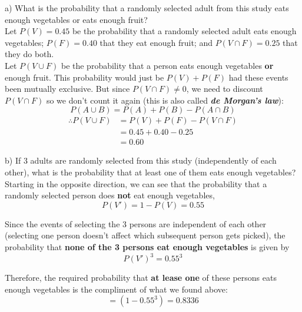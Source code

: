 \documentclass[boxes, qed]{homework}
\begin{document}
\begin{solution}
  a) What is the probability that a randomly selected adult 
  from this study eats enough vegetables or eats enough fruit?\\

  Let $P(V) = 0.45$ be the probability that a randomly selected
  adult eats enough vegetables; $P(F) = 0.40$ that they eat enough
  fruit; and $P(V \cap F) = 0.25$ that they do both.\\

  Let $P(V \cup {F})$ be the probability that a person eats
  enough vegetables \textbf{or} enough fruit. This probability
  would just be $P(V) + P(F)$ had these events been mutually exclusive.
  But since $P(V \cap F) \ne 0$, we need to discount $P(V \cap F)$
  so we don't count it again (this is also called \textbf{\textit{de Morgan's law}}):
  \begin{equation}
    P(A \cup B) = P(A) + P(B) - P(A \cap B)
  \end{equation}
  \begin{align*}
    \therefore P(V \cup F) &= P(V) + P(F) - P(V \cap F)\\
    &= 0.45 + 0.40 - 0.25\\
    &= \boxed{0.60}
  \end{align*}

  b) If 3 adults are randomly selected from this study 
  (independently of each other), what is the probability that
  at least one of them eats enough vegetables?\\

  Starting in the opposite direction,
  we can see that the probability that a randomly selected
  person does \textbf{not} eat enough vegetables,
  $$P(V{'}) = 1 - P(V) = 0.55$$

  Since the events of selecting the 3 persons are independent
  of each other (selecting one person doesn't affect which 
  subsequent person gets picked), the probability that
  \textbf{none of the 3 persons eat enough vegetables} is given by
  $$P(V{'})^3 = 0.55^3$$

  Therefore, the required probability that \textbf{at lease one} of these
  persons eats enough vegetables is the compliment of what we found above:
  $$=(1-0.55^3) = 0.8336$$
\end{solution}
\end{document}
